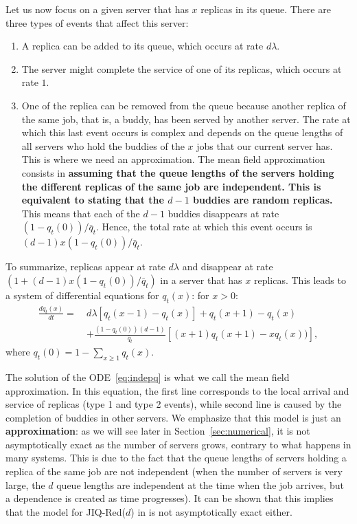 \documentclass[acmsmall,nonacm]{acmart}
\begin{document}
Let us now focus on a given server that has $x$ replicas in its queue. There are three types of events that affect this server: \begin{enumerate}
    \item A replica can be added to its queue, which occurs at rate $d\lambda$.
    \item The server might complete the service of one of its replicas, which occurs at rate $1$.
    \item One of the replica can be removed from the queue because another replica of the same job, that is, a buddy, has been served by another server. The rate at which this last event occurs is complex and depends on the queue lengths of all servers who hold the buddies of the $x$ jobs that our current server has. This is where we need an approximation. The mean field approximation consists in 
    {\bf assuming that the queue lengths of the servers holding the different replicas of the same job are independent. 
    This is equivalent to stating that the $d-1$ buddies are random replicas.} This means that each of the $d-1$ buddies disappears 
    at rate $(1-q_t(0))/\bar{q}_t$. Hence, the total rate at which this event occurs is $(d-1)x(1-q_t(0))/\bar{q}_t$.
\end{enumerate}
To summarize, replicas appear at rate $d\lambda$ and disappear at rate $(1+(d-1)x(1-q_t(0))/\bar{q}_t)$ in a server that has $x$ replicas.  This leads to  a system of differential equations for $q_t(x)$: for $x>0$:
\begin{align}\label{eq:indepq}
    \frac{d q_t(x)}{dt} =~ & d\lambda \left[q_t(x-1)-q_t(x)\right] + q_t(x+1) - q_t(x) \\
    &+  \frac{(1-q_t(0))(d-1)}{\bar q_t} \left[(x+1)q_t(x+1)-xq_t(x)) \right],\nonumber
\end{align}
where $q_t(0)=1-\sum_{x\geq 1} q_t(x)$.

The solution of the ODE~\eqref{eq:indepq} is what we call the mean field approximation. In this equation, the first line corresponds to the local arrival and service of replicas (type 1 and type 2 events), while second line is caused by the completion of buddies in other servers.  We emphasize that this model is just an {\bf approximation}: as we will see later in Section~\ref{sec:numerical}, it is not asymptotically exact as the number of servers grows, contrary to what happens in many systems. This is due to the fact that the queue lengths of servers holding a replica of the same job are not independent (when the number of servers is very large, the $d$ queue lengths are independent at the time when the job arrives, but a dependence is created as time progresses). It can be shown that this implies that the model for JIQ-Red($d$) in \cite{Harte} is not asymptotically
exact either.
\end{document}
